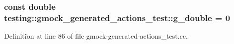 \subsubsection[{\texorpdfstring{g\+\_\+double}{g_double}}]{\setlength{\rightskip}{0pt plus 5cm}const double testing\+::gmock\+\_\+generated\+\_\+actions\+\_\+test\+::g\+\_\+double = 0}\hypertarget{namespacetesting_1_1gmock__generated__actions__test_aa10d8101300a51dd20ab028fa9971313}{}\label{namespacetesting_1_1gmock__generated__actions__test_aa10d8101300a51dd20ab028fa9971313}


Definition at line 86 of file gmock-\/generated-\/actions\+\_\+test.\+cc.

